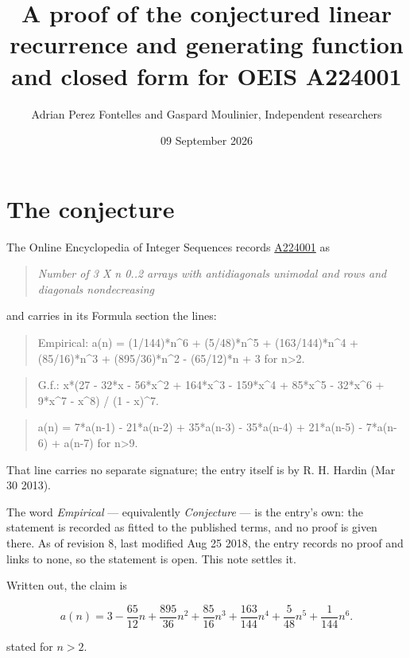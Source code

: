 \documentclass[11pt]{article}
\title{A proof of the conjectured linear recurrence and generating function and closed form for OEIS A224001}
\author{Adrian Perez Fontelles and Gaspard Moulinier, Independent researchers}
\date{09 September 2026}
\theoremstyle{definition}
\begin{document}
\maketitle
\section{The conjecture}

The Online Encyclopedia of Integer Sequences records \href{https://oeis.org/A224001}{A224001} as

\begin{quote}\itshape Number of 3 X n 0..2 arrays with antidiagonals unimodal and rows and diagonals nondecreasing\end{quote}

and carries in its Formula section the lines:

\begin{quote}\ttfamily Empirical: a(n) = (1/144)*n\textasciicircum{}6 + (5/48)*n\textasciicircum{}5 + (163/144)*n\textasciicircum{}4 + (85/16)*n\textasciicircum{}3 + (895/36)*n\textasciicircum{}2 - (65/12)*n + 3 for n>2.\end{quote}

\begin{quote}\ttfamily G.f.: x*(27 - 32*x - 56*x\textasciicircum{}2 + 164*x\textasciicircum{}3 - 159*x\textasciicircum{}4 + 85*x\textasciicircum{}5 - 32*x\textasciicircum{}6 + 9*x\textasciicircum{}7 - x\textasciicircum{}8) / (1 - x)\textasciicircum{}7.\end{quote}

\begin{quote}\ttfamily a(n) = 7*a(n-1) - 21*a(n-2) + 35*a(n-3) - 35*a(n-4) + 21*a(n-5) - 7*a(n-6) + a(n-7) for n>9.\end{quote}

That line carries no separate signature; the entry itself is by R. H. Hardin (Mar 30 2013).

The word {\itshape Empirical} --- equivalently {\itshape Conjecture} --- is the entry's own: the statement is recorded as fitted to the published terms, and no proof is given there. As of revision 8, last modified Aug 25 2018, the entry records no proof and links to none, so the statement is open. This note settles it.

Written out, the claim is

\[a(n) = 3 - \frac{65}{12}n + \frac{895}{36}n^{2} + \frac{85}{16}n^{3} + \frac{163}{144}n^{4} + \frac{5}{48}n^{5} + \frac{1}{144}n^{6}.\]

stated for $n > 2$.
\end{document}
